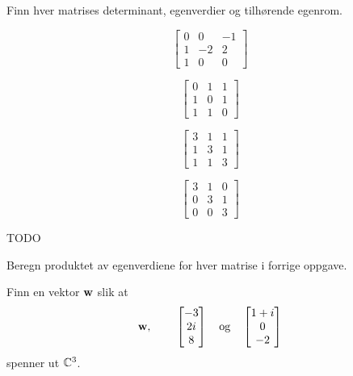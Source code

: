 \begin{oppgave}
Finn hver matrises determinant, egenverdier og tilhørende egenrom. 
\begin{punkt}
\[
\begin{bmatrix}
0 & 0 & -1 \\ 1 & -2 & 2 \\ 1 & 0 & 0 
\end{bmatrix}
\]
\end{punkt}

\begin{punkt}
\[
\begin{bmatrix}
0 & 1 & 1 \\ 1 & 0 & 1 \\ 1 & 1 & 0 
\end{bmatrix}
\]
\end{punkt}


\begin{punkt}
\[
\begin{bmatrix}
3 & 1 & 1 \\ 1 & 3 & 1 \\ 1 & 1 & 3 
\end{bmatrix}
\]
\end{punkt}

\begin{punkt}
\[
\begin{bmatrix}
3 & 1 & 0 \\ 0 & 3 & 1 \\ 0 & 0 & 3 
\end{bmatrix}
\]
\end{punkt}

\end{oppgave}


\begin{losning}
TODO
\end{losning}

\begin{oppgave}
Beregn produktet av egenverdiene for hver matrise i forrige oppgave.
\end{oppgave}

\begin{oppgave}
Finn en vektor $\mathbf{w}$ slik at
\[
\mathbf{w},
\quad 
\text{}
\quad 
\begin{bmatrix}
-3 \\ 2i \\ 8 
\end{bmatrix}
\quad 
\text{og}
\quad 
\begin{bmatrix}
1+i \\ 0 \\ -2 
\end{bmatrix}
\]
spenner ut $\mathbb{C}^3$.
\end{oppgave}


